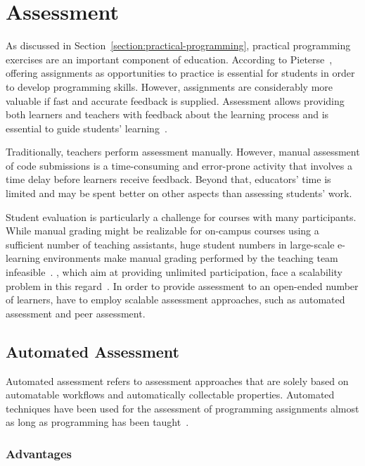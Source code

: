 \section{Assessment}\label{section:assessment1}

As discussed in Section~\ref{section:practical-programming}, practical programming exercises are an important component of \cs education. According to Pieterse~\cite{pieterse2013automated}, offering assignments as opportunities to practice is essential for students in order to develop programming skills. However, assignments are considerably more valuable if fast and accurate feedback is supplied. Assessment allows providing both learners and teachers with feedback about the learning process and is essential to guide students' learning~\cite{ihantola2010review}.

Traditionally, teachers perform assessment manually. However, manual assessment of code submissions is a time-consuming and error-prone activity that involves a time delay before learners receive feedback. Beyond that, educators' time is limited and may be spent better on other aspects than assessing students' work.

Student evaluation is particularly a challenge for courses with many participants. While manual grading might be realizable for on-campus courses using a sufficient number of teaching assistants, huge student numbers in large-scale e-learning environments make manual grading performed by the teaching team infeasible~\cite{shah2014some}. \moocs, which aim at providing unlimited participation, face a scalability problem in this regard~\cite{rogers2014acce}. In order to provide assessment to an open-ended number of learners, \moocs have to employ scalable assessment approaches, such as automated assessment and peer assessment.

\subsection{Automated Assessment}\label{subsection:automatic-assessment}

Automated assessment refers to assessment approaches that are solely based on automatable workflows and automatically collectable properties. Automated techniques have been used for the assessment of programming assignments almost as long as programming has been taught~\cite{pieterse2013automated}.

\subsubsection{Advantages}

